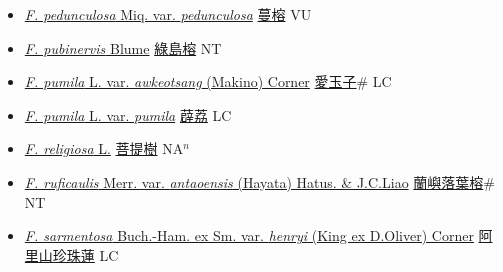 \begin{itemize}
\begin{itemize}
        \item[] \href{http://www.theplantlist.org/tpl1.1/search?q=Ficus+pedunculosa+var.+pedunculosa}{\textit{F. pedunculosa} Miq. var. \textit{pedunculosa}}   \href{\detokenize{http://taibnet.sinica.edu.tw/chi/taibnet_species_list.php?T2=蔓榕&T2_new_value=true&fr=y}}{蔓榕} VU
        \item[] \href{http://www.theplantlist.org/tpl1.1/search?q=Ficus+pubinervis}{\textit{F. pubinervis} Blume}   \href{\detokenize{http://taibnet.sinica.edu.tw/chi/taibnet_species_list.php?T2=綠島榕&T2_new_value=true&fr=y}}{綠島榕} NT
        \item[] \href{http://www.theplantlist.org/tpl1.1/search?q=Ficus+pumila+var.+awkeotsang}{\textit{F. pumila} L. var. \textit{awkeotsang} (Makino) Corner}   \href{\detokenize{http://taibnet.sinica.edu.tw/chi/taibnet_species_list.php?T2=愛玉子&T2_new_value=true&fr=y}}{愛玉子}\# LC
        \item[] \href{http://www.theplantlist.org/tpl1.1/search?q=Ficus+pumila+var.+pumila}{\textit{F. pumila} L. var. \textit{pumila}}   \href{\detokenize{http://taibnet.sinica.edu.tw/chi/taibnet_species_list.php?T2=薜荔&T2_new_value=true&fr=y}}{薜荔} LC
        \item[] \href{http://www.theplantlist.org/tpl1.1/search?q=Ficus+religiosa}{\textit{F. religiosa} L.}   \href{\detokenize{http://taibnet.sinica.edu.tw/chi/taibnet_species_list.php?T2=菩提樹&T2_new_value=true&fr=y}}{菩提樹} NA$^n$
        \item[] \href{http://www.theplantlist.org/tpl1.1/search?q=Ficus+ruficaulis+var.+antaoensis}{\textit{F. ruficaulis} Merr. var. \textit{antaoensis} (Hayata) Hatus. \& J.C.Liao}   \href{\detokenize{http://taibnet.sinica.edu.tw/chi/taibnet_species_list.php?T2=蘭嶼落葉榕&T2_new_value=true&fr=y}}{蘭嶼落葉榕}\# NT
        \item[] \href{http://www.theplantlist.org/tpl1.1/search?q=Ficus+sarmentosa+var.+henryi}{\textit{F. sarmentosa} Buch.-Ham. ex Sm. var. \textit{henryi} (King ex D.Oliver) Corner}   \href{\detokenize{http://taibnet.sinica.edu.tw/chi/taibnet_species_list.php?T2=阿里山珍珠蓮&T2_new_value=true&fr=y}}{阿里山珍珠蓮} LC

\end{itemize}
\end{itemize}
